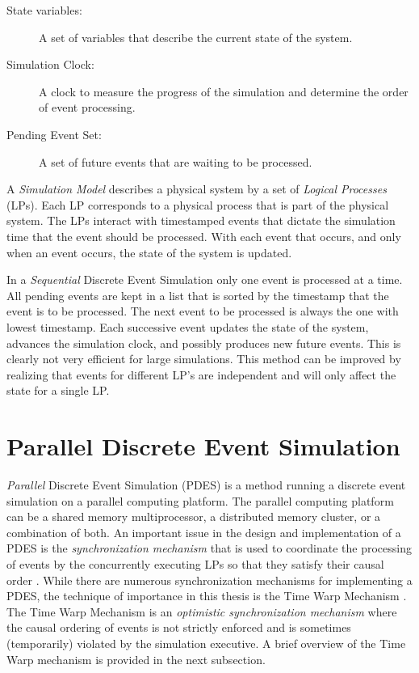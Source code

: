 \documentclass[11pt]{book}
\begin{document}
\begin{description}
\item[State variables: ] A set of variables that describe the current state of the system.
\item[Simulation Clock: ] A clock to measure the progress of the simulation and determine the order
  of event processing.
\item[Pending Event Set: ] A set of future events that are waiting to be processed.
\end{description}

\noindent
A \emph{Simulation Model} describes a physical system by a set of \emph{Logical Processes} (LPs).
Each LP corresponds to a physical process that is part of the physical system.  The LPs interact
with timestamped events that dictate the simulation time that the event should be processed.  With
each event that occurs, and only when an event occurs, the state of the system is updated.

In a \emph{Sequential} Discrete Event Simulation only one event is processed at a time.  All pending
events are kept in a list that is sorted by the timestamp that the event is to be processed.  The
next event to be processed is always the one with lowest timestamp.  Each successive event updates
the state of the system, advances the simulation clock, and possibly produces new future events.
This is clearly not very efficient for large simulations.  This method can be improved by realizing
that events for different LP's are independent and will only affect the state for a single LP.

\section{Parallel Discrete Event Simulation}

\emph{Parallel} Discrete Event Simulation (PDES) is a method running a discrete event simulation on
a parallel computing platform.  The parallel computing platform can be a shared memory
multiprocessor, a distributed memory cluster, or a combination of both.  An important issue in the
design and implementation of a PDES is the \emph{synchronization mechanism} that is used to
coordinate the processing of events by the concurrently executing LPs so that they satisfy their
causal order \cite{lamport-78}.  While there are numerous synchronization mechanisms for
implementing a PDES, the technique of importance in this thesis is the Time Warp Mechanism
\cite{jefferson-85,fujimoto-90,fujimoto-00}.  The Time Warp Mechanism is an \emph{optimistic
  synchronization mechanism} where the causal ordering of events is not strictly enforced and is
sometimes (temporarily) violated by the simulation executive.  A brief overview of the Time Warp
mechanism is provided in the next subsection.
\end{document}
